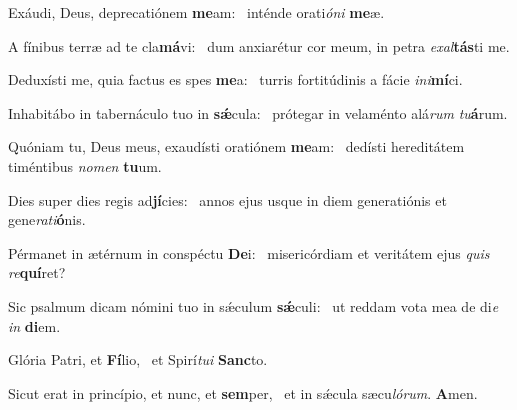 \item Exáudi, Deus, deprecatiónem \textbf{me}am:~\psstar{} inténde orati\textit{óni} \textbf{me}æ.
\item A fínibus terræ ad te cla\textbf{má}vi:~\psstar{} dum anxiarétur cor meum, in petra \textit{exal}\textbf{tás}ti me.
\item Deduxísti me, quia factus es spes \textbf{me}a:~\psstar{} turris fortitúdinis a fácie \textit{ini}\textbf{mí}ci.
\item Inhabitábo in tabernáculo tuo in \textbf{sǽ}cula:~\psstar{} prótegar in velaménto alá\textit{rum} \textit{tu}\textbf{á}rum.
\item Quóniam tu, Deus meus, exaudísti oratiónem \textbf{me}am:~\psstar{} dedísti hereditátem timéntibus \textit{nomen} \textbf{tu}um.
\item Dies super dies regis ad\textbf{jí}cies:~\psstar{} annos ejus usque in diem generatiónis et gene\textit{rati}\textbf{ó}nis.
\item Pérmanet in ætérnum in conspéctu \textbf{De}i:~\psstar{} misericórdiam et veritátem ejus \textit{quis} \textit{re}\textbf{quí}ret?
\item Sic psalmum dicam nómini tuo in sǽculum \textbf{sǽ}culi:~\psstar{} ut reddam vota mea de di\textit{e} \textit{in} \textbf{di}em.
\item Glória Patri, et \textbf{Fí}lio,~\psstar{} et Spirí\textit{tui} \textbf{Sanc}to.
\item Sicut erat in princípio, et nunc, et \textbf{sem}per,~\psstar{} et in sǽcula sæcu\textit{lórum}. \textbf{A}men.
